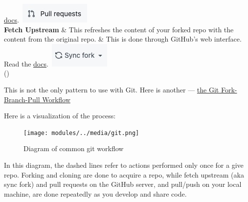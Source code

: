 \documentclass[
  letterpaper,
  DIV=11,
  numbers=noendperiod]{scrreport}
\begin{document}
\begin{longtable}[]
\href{https://docs.github.com/en/pull-requests}{docs}.~\includegraphics{modules/../media/pull-request-button.jpg} \\
\textbf{Fetch Upstream} & This refreshes the content of your forked repo
with the content from the original repo. & This is done through GitHub's
web interface. Read the
\href{https://docs.github.com/en/pull-requests/collaborating-with-pull-requests/working-with-forks/syncing-a-fork}{docs}.~\includegraphics{modules/../media/sync-fork.jpg} \\
\bottomrule()
\end{longtable}

\begin{tcolorbox}[enhanced jigsaw, bottomrule=.15mm, leftrule=.75mm, opacityback=0, toprule=.15mm, colback=white, rightrule=.15mm, left=2mm, coltitle=black, arc=.35mm, breakable, colframe=quarto-callout-note-color-frame, toptitle=1mm, bottomtitle=1mm, title=\textcolor{quarto-callout-note-color}{\faInfo}\hspace{0.5em}{Note}, opacitybacktitle=0.6, titlerule=0mm, colbacktitle=quarto-callout-note-color!10!white]

This is not the only pattern to use with Git. Here is another ---
\href{https://www.tomasbeuzen.com/post/git-fork-branch-pull/}{the Git
Fork-Branch-Pull Workflow}

\end{tcolorbox}

Here is a visualization of the process:

\begin{figure}

{\centering \texttt{[image: modules/../media/git.png]}

}

\caption{Diagram of common git workflow}

\end{figure}

In this diagram, the dashed lines refer to actions performed only once
for a give repo. Forking and cloning are done to acquire a repo, while
fetch upstream (aka sync fork) and pull requests on the GitHub server,
and pull/push on your local machine, are done repeatedly as you develop
and share code.
\end{document}

